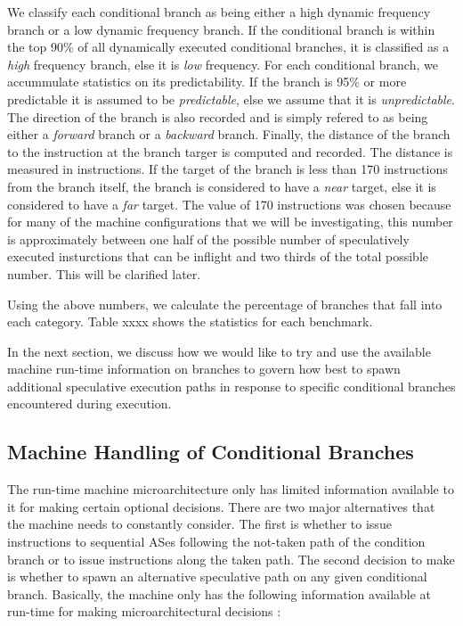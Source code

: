 \documentclass[10pt,dvips]{article}
\begin{document}
We classify each conditional branch as 
being either a high dynamic frequency branch
or a low dynamic frequency branch.  If the conditional branch
is within the top 90\% of all dynamically executed conditional branches,
it is classified as a \textit{high} frequency branch, else it 
is \textit{low} frequency.
For each conditional branch, we accummulate statistics on
its predictability.  If the branch is 95\% or more predictable
it is assumed to be 
\textit{predictable}, else we assume that it is
\textit{unpredictable}.
The direction of the branch is also recorded and is simply
refered to as being either a 
\textit{forward} branch or a 
\textit{backward} branch.
Finally, the distance of the branch to 
the instruction at the
branch targer is computed and recorded.  The distance is measured
in instructions.  If the target of the branch is less than 170 instructions
from the branch itself, the branch is considered to have a 
\textit{near} target, else it is considered to have a
\textit{far} target.  The value of 170 instructions was chosen
because for many of the machine configurations that we will be
investigating, this number is approximately between one half of
the possible number of speculatively executed insturctions
that can be inflight and two thirds of the total possible number.
This will be clarified later.

Using the above numbers, we calculate the percentage of branches that fall into each category.  Table xxxx shows the statistics for each benchmark.  



In the next section, we discuss how we would like to try and
use the available machine run-time information on branches to
govern how best to spawn additional speculative execution paths
in response to specific conditional branches encountered during execution.
%
\subsection{Machine Handling of Conditional Branches}
%
The run-time machine microarchitecture only has limited information
available to it for making certain optional decisions.
There are two major alternatives that the machine needs to constantly
consider.  The first is whether to issue instructions to sequential
ASes following
the not-taken path of the condition branch or to issue instructions
along the 
taken path.  The second decision to make is
whether to spawn an alternative speculative path
on any given conditional branch.
Basically, the machine only has the following information
available at run-time for making microarchitectural decisions :
\end{document}

